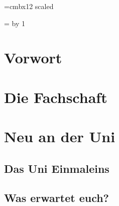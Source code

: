 \documentclass[12pt, a4paper]{article}
\newif\ifinfo
\begin{document}
\emergencystretch=2cm

\font\vlarge=cmbx12 scaled 
\newdimen\oldbaselineskp
\newcount\auflage
\newcount\jahr
\newcount\jahrpluseins
\setcounter{secnumdepth}{0}

\newcommand*{\email}[1]{\url{#1}}
\newcommand*{\filename}[1]{\url{#1}}



\jahrpluseins=\jahr
\advance \jahrpluseins by 1

\ifinfo
	
\else
	
\fi

\ifinfo
	
\else
	
\fi


\section{Vorwort}
\ifinfo
	
\else
	
\fi


\tableofcontents
\newpage

\onecolumn
\section{Die Fachschaft}
\ifinfo
	
\else
	
\fi

\section{Neu an der Uni}
\subsection{Das Uni Einmaleins}
\ifinfo
	

\else
	


	\subsection{Was erwartet euch?}
	
\end{document}
